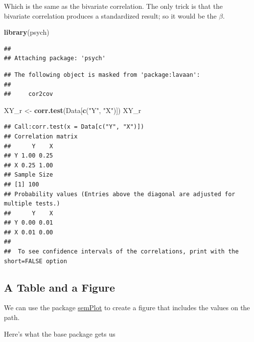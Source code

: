 \documentclass[
  11pt,
]{book}
\newenvironment{Shaded}{\begin{snugshade}}{\end{snugshade}}
\newcommand{\FunctionTok}[1]{\textcolor[rgb]{0.27,0.27,0.27}{\textbf{#1}}}
\newcommand{\NormalTok}[1]{#1}
\newcommand{\OtherTok}[1]{\textcolor[rgb]{0.37,0.37,0.37}{#1}}
\newcommand{\StringTok}[1]{\textcolor[rgb]{0.5,0.5,0.5}{#1}}
\begin{document}
Which is the same as the bivariate correlation. The only trick is that the bivariate correlation produces a standardized result; so it would be the \(\beta\).

\begin{Shaded}
\begin{Highlighting}[]
\FunctionTok{library}\NormalTok{(psych)}
\end{Highlighting}
\end{Shaded}

\begin{verbatim}
## 
## Attaching package: 'psych'
\end{verbatim}

\begin{verbatim}
## The following object is masked from 'package:lavaan':
## 
##     cor2cov
\end{verbatim}

\begin{Shaded}
\begin{Highlighting}[]
\NormalTok{XY\_r }\OtherTok{\textless{}{-}} \FunctionTok{corr.test}\NormalTok{(Data[}\FunctionTok{c}\NormalTok{(}\StringTok{"Y"}\NormalTok{, }\StringTok{"X"}\NormalTok{)])}
\NormalTok{XY\_r}
\end{Highlighting}
\end{Shaded}

\begin{verbatim}
## Call:corr.test(x = Data[c("Y", "X")])
## Correlation matrix 
##      Y    X
## Y 1.00 0.25
## X 0.25 1.00
## Sample Size 
## [1] 100
## Probability values (Entries above the diagonal are adjusted for multiple tests.) 
##      Y    X
## Y 0.00 0.01
## X 0.01 0.00
## 
##  To see confidence intervals of the correlations, print with the short=FALSE option
\end{verbatim}

\hypertarget{a-table-and-a-figure}{%
\subsection{A Table and a Figure}\label{a-table-and-a-figure}}

We can use the package \href{https://rdrr.io/cran/semPlot/man/semPaths.html}{semPlot} to create a figure that includes the values on the path.

Here's what the base package gets us
\end{document}
